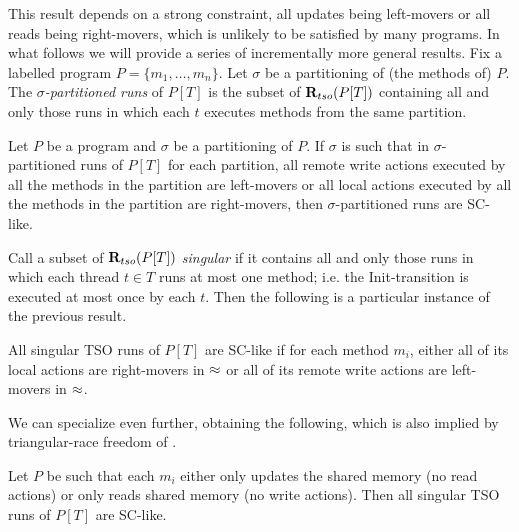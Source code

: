 This result depends on a strong constraint, all updates being left-movers or all reads being right-movers, which is unlikely to be satisfied by many programs.
In what follows we will provide a series of incrementally more general results.
Fix a labelled program $P=\{m_1,\ldots,m_n\}$.
Let $\sigma$ be a partitioning of (the methods of) $P$.
The {\em $\sigma$-partitioned runs} of $P[T]$ is the subset of $\mathbf{R}_{tso}(P[T])$ containing all and only those runs in which each $t$ executes methods from the same partition.
\begin{lemma}
Let $P$ be a program and $\sigma$ be a partitioning of $P$.
If $\sigma$ is such that in $\sigma$-partitioned runs of $P[T]$ for each partition, all remote write actions executed by all the methods in the partition are left-movers or all local actions executed by all the methods in the partition are right-movers, then $\sigma$-partitioned runs are SC-like.
\end{lemma}
Call a subset of $\mathbf{R}_{tso}(P[T])$ {\em singular} if it contains all and only those runs in which each thread $t\in T$ runs at most one method; i.e. the {\sc\small Init}-transition is executed at most once by each $t$.
Then the following is a particular instance of the previous result.
\begin{corollary}
All singular TSO runs of $P[T]$ are SC-like if for each method $m_i$, either all of its local actions are right-movers in $\approx$ or all of its remote write actions are left-movers in $\approx$. 
\end{corollary}
We can specialize even further, obtaining the following, which is also implied by triangular-race freedom of \cite{Owe2010}.
\begin{corollary}
Let $P$ be such that each $m_i$ either only updates the shared memory (no read actions) or only reads shared memory (no write actions).
Then all singular TSO runs of $P[T]$ are SC-like.
\end{corollary}

